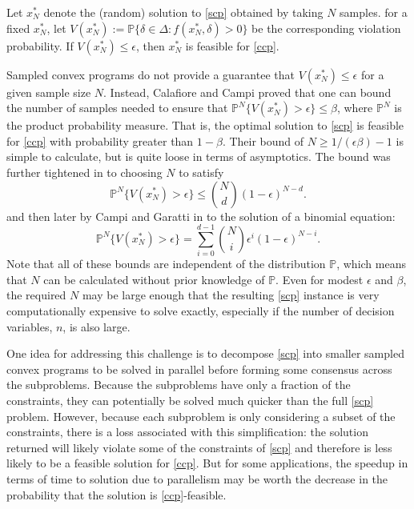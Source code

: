\documentclass[12pt]{article}
\begin{document}
Let $x_N^*$ denote the (random) solution to \ref{scp} obtained by taking $N$ samples.
for a fixed $x_N^*$, let $V(x_N^*) := \mathbb{P}\{\delta \in \Delta: f(x_N^*, \delta) > 0\}$ be the corresponding violation probability.
If $V(x_N^*) \leq \epsilon$, then $x_N^*$ is feasible for \ref{ccp}.

Sampled convex programs do not provide a guarantee that $V(x_N^*) \leq \epsilon$ for a given sample size $N$.
Instead, Calafiore and Campi \cite{campi05} proved that one can bound the number of samples needed to ensure that $\mathbb{P}^N\{V(x_N^*) > \epsilon\} \leq \beta$,  where $\mathbb{P}^N$ is the product probability measure.
That is, the optimal solution to \ref{scp} is feasible for \ref{ccp} with probability greater than $1 - \beta$.
Their bound of $N \geq 1/(\epsilon\beta) - 1$ is simple to calculate, but is quite loose in terms of asymptotics.
The bound was further tightened in \cite{campi06} to choosing $N$ to satisfy
\[ \mathbb{P}^N\{V(x_N^*) > \epsilon\} \leq \binom{N}{d}(1-\epsilon)^{N-d}. \]
and then later by Campi and Garatti in \cite{campi08} to the solution of a binomial equation:
\[ \mathbb{P}^N\{V(x_N^*) > \epsilon\} = \sum_{i=0}^{d-1} \binom{N}{i} \epsilon^i (1-\epsilon)^{N-i}. \]
Note that all of these bounds are independent of the distribution $\mathbb{P}$, which means that $N$ can be calculated without prior knowledge of $\mathbb{P}$.
Even for modest $\epsilon$ and $\beta$, the required $N$ may be large enough that the resulting \ref{scp} instance is very computationally expensive to solve exactly, especially if the number of decision variables, $n$, is also large.

One idea for addressing this challenge is to decompose \ref{scp} into smaller sampled convex programs to be solved in parallel before forming some consensus across the subproblems.
Because the subproblems have only a fraction of the constraints, they can potentially be solved much quicker than the full \ref{scp} problem.
However, because each subproblem is only considering a subset of the constraints, there is a loss associated with this simplification: the solution returned will likely violate some of the constraints of \ref{scp} and therefore is less likely to be a feasible solution for \ref{ccp}.
But for some applications, the speedup in terms of time to solution due to parallelism may be worth the decrease in the probability that the solution is \ref{ccp}-feasible.
\end{document}
